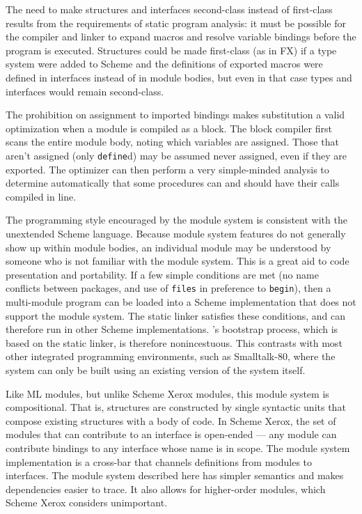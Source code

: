 The need to make structures and interfaces second-class instead of
first-class results from the requirements of static program analysis:
it must be possible for the compiler and linker to expand macros and
resolve variable bindings before the program is executed.  Structures
could be made first-class (as in FX\cite{Sheldon-Gifford:Static}) if a
type system were added to Scheme and the definitions of exported
macros were defined in interfaces instead of in module bodies, but
even in that case types and interfaces would remain second-class.

The prohibition on assignment to imported bindings makes substitution
a valid optimization when a module is compiled as a block.  The block
compiler first scans the entire module body, noting which variables
are assigned.  Those that aren't assigned (only {\tt define}d) may be
assumed never assigned, even if they are exported.  The optimizer can
then perform a very simple-minded analysis to determine automatically
that some procedures can and should have their calls compiled in line.

The programming style encouraged by the module system is consistent
with the unextended Scheme language.  Because module system features
do not generally show up within module bodies, an individual module
may be understood by someone who is not familiar with the module
system.  This is a great aid to code presentation and portability.  If
a few simple conditions are met (no name conflicts between packages,
and use of {\tt files} in preference to
{\tt begin}), then a multi-module program can be loaded into a Scheme
implementation that does not support the module system.  The \hack{}
static linker satisfies these conditions, and can therefore run in
other Scheme implementations.  \hack{}'s bootstrap process, which is
based on the static linker, is therefore nonincestuous.  This
contrasts with most other integrated programming environments, such as
Smalltalk-80, where the system can only be built using an existing
version of the system itself.

Like ML modules, but unlike Scheme Xerox modules, this module system
is compositional.  That is, structures are constructed by single
syntactic units that compose existing structures with a body of code.
In Scheme Xerox, the set of modules that can contribute to an
interface is open-ended --- any module can contribute bindings to any
interface whose name is in scope.  The module system implementation is
a cross-bar that channels definitions from modules to interfaces.  The
module system described here has simpler semantics and makes
dependencies easier to trace.  It also allows for higher-order
modules, which Scheme Xerox considers unimportant.

%
%

